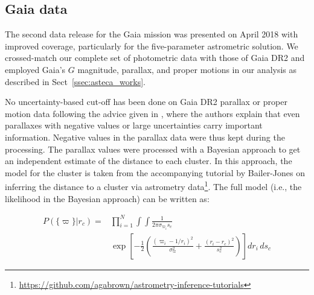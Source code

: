 \documentclass[draft]{aa}
\begin{document}
\subsection{Gaia data}
\label{ssec:gaia_data}

The second data release for the Gaia mission \citep{GaiaDR2_2018} was presented
on April 2018 with improved coverage, particularly for the five-parameter
astrometric solution.
We crossed-match our complete set of photometric data with those of Gaia DR2
and employed Gaia's $G$ magnitude, parallax, and proper motions in our
analysis as described in Sect~\ref{ssec:asteca_works}.

No uncertainty-based cut-off has been done on Gaia DR2 parallax or proper
motion data following the advice given in \cite{Luri_2018}, where the
authors explain that even parallaxes with negative values or large
uncertainties carry important information. Negative values in the parallax
data were thus kept during the processing. The parallax values
were processed with a Bayesian approach to get an independent estimate of the
distance to each cluster. In this approach, the model for the cluster is
taken from the accompanying tutorial by Bailer-Jones on inferring the distance
to a cluster via astrometry
data\footnote{
\url{https://github.com/agabrown/astrometry-inference-tutorials}}.
The full model (i.e., the likelihood in the Bayesian approach) can be
written as:

\begin{equation}
\begin{aligned}
P\left(\{\varpi\} | r_{c}\right)
= & {} \prod_{i=1}^{N} \int \int \frac{1}{2 \pi \sigma_{\varpi_{i}} s_{c}} \\
& \exp \left[-\frac{1}{2} \left( \frac{\left(\varpi_{i}-1 / r_{i}\right)^{2}}{
\sigma_{\varpi}^{2}} + \frac{\left(r_{i}-r_{c}\right)^{2}}{s_{c}^
{2}}\right)\right]
d r_{i}\,d s_{c}
\label{eq:plx_lkl}
\end{aligned}
\end{equation}
\end{document}
